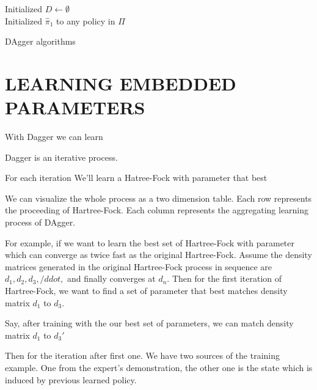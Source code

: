 \documentclass[twoside]{article}
\begin{document}
\begin{algorithm}[htb]
 \KwData{}
 Initialized $D \leftarrow \emptyset$ \\
 Initialized $\hat{\pi}_1$ to any policy in $\Pi$ \\
 \caption{DAgger algorithms}
\end{algorithm}


\section{LEARNING EMBEDDED PARAMETERS}

With Dagger we can learn 

Dagger is an iterative process.

For each iteration We'll learn a Hatree-Fock with parameter that best 

We can visualize the whole process as a two dimension table.
Each row represents the proceeding of Hartree-Fock.
Each column represents the aggregating learning process of DAgger.

For example, if we want to learn the best set of Hartree-Fock with parameter which can converge as twice fast as the original Hartree-Fock.
Assume the density matrices generated in the original Hartree-Fock process in sequence are  $d_1, d_2, d_3, /ddot,$ and finally converges at $d_n$.
Then for the first iteration of Hartree-Fock, we want to find a set of parameter that best matches density matrix $d_1$ to $d_3$.



Say, after training with the our best set of parameters, we can match density matrix $d_1$ to $d_{3}'$

Then for the iteration after first one.
We have two sources of the training example. One from the expert's demonstration, the other one is the state which is induced by previous learned policy.
\end{document}
